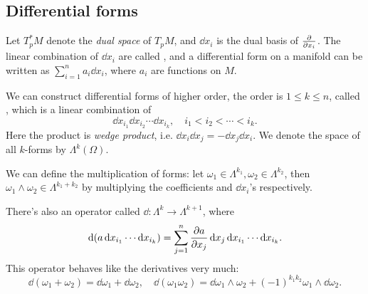 \subsection{Differential forms}
\label{sub:Differential forms}
Let $T^*_pM$ denote the \textit{dual space} of $T_pM$,
and  $\dd x_i$ is the dual basis of $\frac{\partial }{\partial x_i}$.
The linear combination of $\dd x_i$ are called ,
and a differential form on a manifold can be written as $ \sum_{i=1}^{n} a_i\dd x_i$,
where $a_i$ are functions on $M$.

We can construct differential forms of higher order, the order is $1 \le k\le n$,
called , which is a linear combination of
\[
\dd x_{i_1}\dd x_{i_2}\cdots \dd x_{i_k}, \quad i_1<i_2<\cdots<i_k.
\]
Here the product is \textit{wedge product},
i.e. $\dd x_i \dd x_j = -\dd x_j \dd x_i$.
We denote the space of all $k$-forms by $\Lambda^k(\Omega)$.

We can define the multiplication of forms:
let  $\omega_1 \in \Lambda^{k_1}, \omega_2\in \Lambda^{k_2}$,
then $\omega_1\wedge \omega_2 \in \Lambda^{k_1+k_2}$ by
multiplying the coefficients and $\dd x_i$'s respectively.

There's also an operator called 
$\dd: \Lambda^k\to \Lambda^{k+1}$,
where
\[
	\mathop{}\!\mathrm{d}(a \mathop{}\!\mathrm{d} x_{i_1}\cdots \mathop{}\!\mathrm{d} x_{i_k}) = \sum_{j=1}^{n} \frac{\partial a}{\partial x_j}
	\mathop{}\!\mathrm{d} x_j \mathop{}\!\mathrm{d} x_{i_1}\cdots \mathop{}\!\mathrm{d} x_{i_k}.
\]
This operator behaves like the derivatives very much:
\[
\dd(\omega_1 + \omega_2) = \dd \omega_1 + \dd \omega_2,\quad
\dd(\omega_1\omega_2) = \dd \omega_1\wedge \omega_2 +
(-1)^{k_1k_2} \omega_1 \wedge \dd \omega_2.
\]


